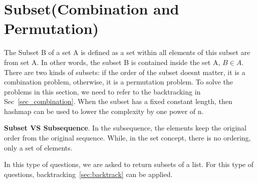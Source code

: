 \documentclass[../../question_3_array_question.tex]{subfiles}
\begin{document}
\section{Subset(Combination and Permutation)}
\label{part4_array_subset}
The Subset B of a set A is defined as a set within all elements of this subset are from set A. In other words, the subset B is contained inside the set A, $B \in A$. There are two kinds of subsets: if the order of the subset doesnt matter, it is a combination problem, otherwise, it is a permutation problem. To solve the problems in this section, we need to refer to the backtracking in Sec~\ref{sec_combination}. When the subset has a fixed constant length, then hashmap can be used to lower the complexity by one power of n.

\textbf{Subset VS Subsequence}. In the subsequence, the elements keep the original order from the original sequence. While, in the set concept, there is no ordering, only a set of elements. 

In this type of questions, we are asked to return subsets of a list. For this type of questions, backtracking~\ref{sec:backtrack} can be applied. 
\end{document}

